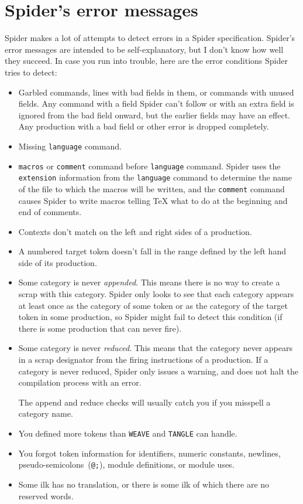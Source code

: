 \section{Spider's error messages}
{Spider} makes a lot of attempts to detect errors in a 
{Spider} specification.
{Spider}'s error messages are intended to be self-explanatory, but
I don't know how well they succeed.
In case you run into trouble, here are the error
conditions {Spider} tries to detect:
\begin{itemize}
\item 
 Garbled commands, lines with bad fields in them, or commands with
unused fields.
Any command with a field {Spider} can't follow or with an extra
field is ignored from the bad field onward, but the earlier fields may
have an effect.
Any production with a bad field or other error is dropped completely.
\item
Missing {\tt language} command.
\item
{\tt macros} or {\tt comment} command before {\tt language} command.
{Spider}  uses the {\tt extension} information
from the  {\tt language} command to determine the name of the file to
which the macros will be written, and  the {\tt comment} command
causes {Spider} to write macros telling {\TeX} what to do at the
beginning and end of comments.
\item
Contexts don't match on the left and right sides of a production.
\item
A numbered target token doesn't fall in the range defined by the
left hand side of its production.
\item
Some category is never {\em appended}.
This means there is no  way to create a scrap with this category.
{Spider} only looks to see that each
category appears at least once as the category of some token or as the
category of the target token in some production, so {Spider} might
fail to detect this condition (if there is some production that can
never fire).
\item
Some category is never {\em reduced}.
This  means that the category never appears in a scrap
designator from the firing instructions of a production.
If a category is never reduced, {Spider} only issues a warning,
and does not halt the compilation process with an error.

The append
and reduce checks will usually catch you if you misspell a category
name.
\item
You defined more tokens than {\tt WEAVE} and {\tt TANGLE} can handle.
\item
You forgot token information for identifiers, numeric
constants, newlines, pseudo-semicolons~({\tt @;}), module definitions,
or module uses.
\item
Some ilk has no translation, or there is some ilk of which there are
no reserved words.
\end{itemize}




